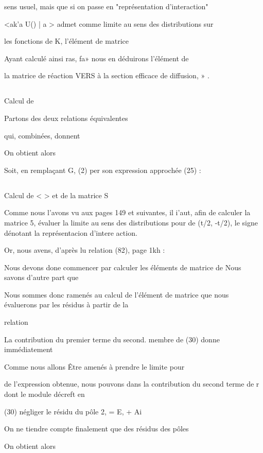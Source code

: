 sens usuel, mais que si on passe en "représentation d'interaction"

<ak'a U() | a > admet comme limite au sens des distributions sur

les fonctions de K, l'élément de matrice 

Ayant calculé ainsi ras, fa» nous en déduirons l'élément de

la matrice de réaction VERS à  la section efficace de diffusion,
» .

\subsection{} Calcul de %

Partons des deux relations équivalentes

qui, combinées, donnent

On obtient alors

Soit, en remplaçant G, (2) per son expression approchée (25) :

\subsection{} Calcul de <  > et de la matrice S%

Comme nous l'avons vu aux pages 149 et suivantes, il i'aut,
afin de calculer la matrice 5, évaluer la limite au sens des distributions
pour  de  (t/2, -t/2), le signe  dénotant la représentacion d'intere
action.

Or, nous avens, d'après lu relation (82), page 1kh :

Nous devons done commencer par calculer les éléments de matrice de
Nous savons d'autre part que 

Nous sommes donc ramenés au calcul de l'élément de matrice
 que nous évaluerons par les résidus à partir de la

relation

La contribution du premier terme du second. membre de (30) donne immédiatement

Comme nous allons Être amenés à prendre le limite pour 

de l'expression obtenue, nous pouvons dans la contribution du second terme de
r
dont le module décreft en



(30) négliger le résidu du pôle 2, = E, + Ai

 On ne tiendre compte finalement que des résidus des pôles

On obtient alors

